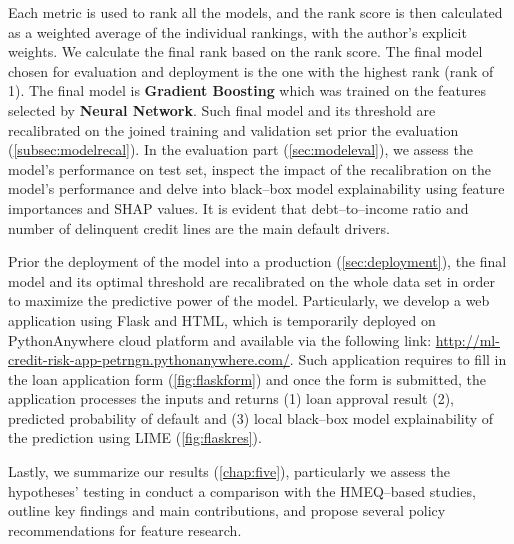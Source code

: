 Each metric is used to rank all the models, and the rank score is then calculated as a weighted average of the individual rankings, with the author's explicit weights. We calculate the final rank based on the rank score.
The final model chosen for evaluation and deployment is the one with the highest rank (rank of 1). 
The final model is \textbf{Gradient Boosting} which was trained on the features selected by \textbf{Neural Network}.
Such final model and its threshold are recalibrated on the joined training and validation set prior the evaluation (\autoref{subsec:modelrecal}).
In the evaluation part (\autoref{sec:modeleval}), we assess the model's performance on test set, inspect the impact of the recalibration on the model's performance and delve into black--box model explainability using feature importances and SHAP values.
It is evident that debt--to--income ratio and number of delinquent credit lines are the main default drivers.

Prior the deployment of the model into a production (\autoref{sec:deployment}), the final model and its optimal threshold are recalibrated on the whole data set in order to maximize the predictive power of the model.
Particularly, we develop a web application using Flask and HTML, which is temporarily deployed on PythonAnywhere cloud platform and available via the following link: \url{http://ml-credit-risk-app-petrngn.pythonanywhere.com/}.
Such application requires to fill in the loan application form  (\autoref{fig:flaskform}) and once the form is submitted, the application processes the inputs and returns (1) loan approval result (2), predicted probability of default and (3) local black--box model explainability of the prediction using LIME (\autoref{fig:flaskres}).

Lastly, we summarize our results (\autoref{chap:five}), particularly we assess the hypotheses' testing in conduct a comparison with the HMEQ--based studies, outline key findings and main contributions, and propose several policy recommendations for feature research.